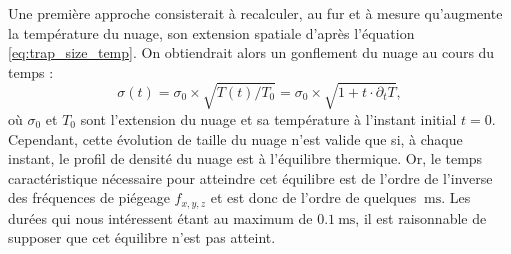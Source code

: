 Une première approche consisterait à recalculer, au fur et à mesure qu'augmente la température du nuage, son extension spatiale d'après l'équation \eqref{eq:trap_size_temp}.
On obtiendrait alors un gonflement du nuage au cours du temps :
\begin{equation}
\label{eq:bigsigma_t}
\sigma(t) = \sigma_0\times\sqrt{T(t)/T_0} = \sigma_0\times\sqrt{1+t\cdot\partial_t T},
\end{equation}
où $\sigma_0$ et $T_0$ sont l'extension du nuage et sa température à l'instant initial $t=0$.
Cependant, cette évolution de taille du nuage n'est valide que si, à chaque instant, le profil de densité du nuage est à l'équilibre thermique.
Or, le temps caractéristique nécessaire pour atteindre cet équilibre est de l'ordre de l'inverse des fréquences de piégeage $f_{x,y,z}$ et est donc de l'ordre de quelques $\SI{}{\ms}$.
Les durées qui nous intéressent étant au maximum de $\SI{0.1}{\ms}$, il est raisonnable de supposer que cet équilibre n'est pas atteint.

